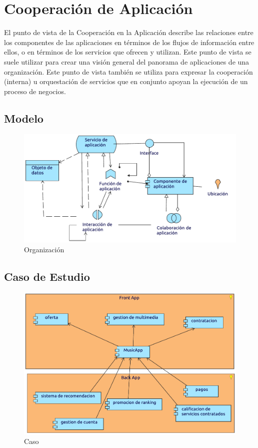 \newpage

\section{Cooperación de Aplicación}
El punto de vista de la Cooperación en la Aplicación describe las relaciones entre los componentes de las aplicaciones en términos de los flujos de información entre ellos, o en términos de los servicios que ofrecen y utilizan. Este punto de vista se suele utilizar para crear una visión general del panorama de aplicaciones de una organización. Este punto de vista también se utiliza para expresar la cooperación (interna) u orquestación de servicios que en conjunto apoyan la ejecución de un proceso de negocios.
\subsection{Modelo}
\begin{figure}[h!]
	\centering
	\includegraphics[width=\linewidth]{Arquitectura/Aplicacion/imgs/CooperacionMetamodelo.pdf}
	\caption{Organización}
\end{figure}
\newpage
\subsection{Caso de Estudio}

\begin{figure}[h!]
	\centering
	\includegraphics[width=\linewidth]{Arquitectura/Aplicacion/imgs/Cooperacion.pdf}
	\caption{Caso}
\end{figure}

\newpage